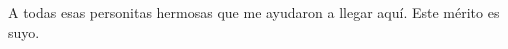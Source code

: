 \begin{dedication}
    A todas esas personitas hermosas que me ayudaron a llegar aquí. Este mérito es suyo.
\end{dedication}
